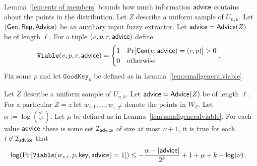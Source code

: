 Lemma~\ref{lem:entr of members} bounds how much information ${\mathsf{advice}}$ contains about the points in the distribution.  Let $Z$ describe a uniform sample of $U_{n,k}$.  Let $({\mathsf{Gen}}, {\mathsf{Rep}}, {\mathsf{Advice}})$ be an auxiliary input fuzzy extractor.  Let ${\mathsf{advice}} = {\mathsf{Advice}}(Z)$ be of length $\ell$.  For a tuple $(v, p, r, {\mathsf{advice}})$ define 
\[
\mathtt{Viable}(v, p, r, {\mathsf{advice}}) = \begin{cases} 1& \Pr[{\mathsf{Gen}}(v, {\mathsf{advice}}) = (r, p)]>0\\0&\text{otherwise}\end{cases}.\]
Fix some $p$ and let $\mathtt{GoodKey}_p$ be defined as in Lemma~\ref{lem:smallgeneralviable}. 

\begin{lemma}
Let $Z$ describe a uniform sample of $U_{n,k}$.  Let ${\mathsf{advice}} = {\mathsf{Advice}}(Z)$ be of length $\ell$.
 For a particular $Z=z$ let $w_{z,1},..., w_{z,2^k}$ denote the points in $W_Z$. Let $\alpha:= \log {2^n\choose 2^k}$.  Let $\mu$ be defined as in Lemma~\ref{lem:smallgeneralviable}.  
For each value ${\mathsf{advice}}$ there is some set $\mathcal{I}_{{\mathsf{advice}}}$ of size at most $\nu+1$, it is true for each $i\not \in \mathcal{I}_{\mathsf{advice}}$ that
\[
\mathsf{log}\!\left(\Pr\left[\mathtt{Viable}(w_{z,i}, p, \mathsf{key}, {\mathsf{advice}}) = 1 \right]\right)\le -\frac{\alpha -|{\mathsf{advice}}| }{2^k}+1+\mu+k-\mathsf{log}\!\left(\nu\right).
\]
\label{lem:entr of members}
\end{lemma}

